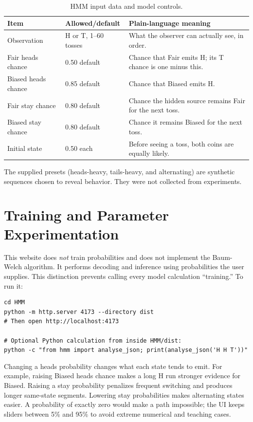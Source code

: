 \documentclass[12pt,a4paper,openany]{report}
\begin{document}
\begin{table}[H]
\centering\small
\caption{HMM input data and model controls.}
\begin{tabularx}{\textwidth}{p{}p{}Y}
\toprule
\textbf{Item} & \textbf{Allowed/default} & \textbf{Plain-language meaning} \\
\midrule
Observation & H or T, 1--60 tosses & What the observer can actually see, in order. \\
Fair heads chance & 0.50 default & Chance that Fair emits H; its T chance is one minus this. \\
Biased heads chance & 0.85 default & Chance that Biased emits H. \\
Fair stay chance & 0.80 default & Chance the hidden source remains Fair for the next toss. \\
Biased stay chance & 0.80 default & Chance it remains Biased for the next toss. \\
Initial state & 0.50 each & Before seeing a toss, both coins are equally likely. \\
\bottomrule
\end{tabularx}
\end{table}

The supplied presets (heads-heavy, tails-heavy, and alternating) are synthetic
sequences chosen to reveal behavior. They were not collected from experiments.

\section{Training and Parameter Experimentation}
This website does \emph{not} train probabilities and does not implement the
Baum-Welch algorithm. It performs decoding and inference using probabilities
the user supplies. This distinction prevents calling every model calculation
``training.'' To run it:
\begin{lstlisting}[style=terminal]
cd HMM
python -m http.server 4173 --directory dist
# Then open http://localhost:4173

# Optional Python calculation from inside HMM/dist:
python -c "from hmm import analyse_json; print(analyse_json('H H T'))"
\end{lstlisting}

Changing a heads probability changes what each state tends to emit. For
example, raising Biased heads chance makes a long H run stronger evidence for
Biased. Raising a stay probability penalizes frequent switching and produces
longer same-state segments. Lowering stay probabilities makes alternating
states easier. A probability of exactly zero would make a path impossible;
the UI keeps sliders between 5\% and 95\% to avoid extreme numerical and
teaching cases.
\end{document}
